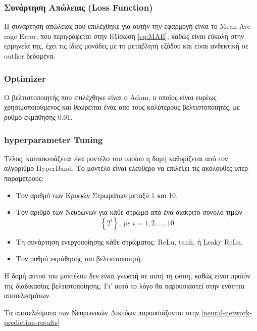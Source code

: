 \subsubsection{Συνάρτηση Απώλειας (\textlatin{Loss Function})}

Η συνάρτηση απώλειας που επιλέχθηκε για αυτήν την εφαρμογή είναι το \textlatin{Mean Average Error}, που περιγράφεται στην Εξίσωση \eqref{eq:MAE}, καθώς είναι εύκολη στην ερμηνεία της, έχει τις ίδιες μονάδες με τη μεταβλητή εξόδου και είναι ανθεκτική σε \textlatin{outlier} δεδομένα.

\subsubsection{\textlatin{Optimizer}}

Ο βελτιστοποιητής που επιλέχθηκε είναι ο \textlatin{Adam}, ο οποίος είναι ευρέως χρησιμοποιούμενος και θεωρείται ένας από τους καλύτερους βελτιστοποιητές, με ρυθμό εκμάθησης 0.01.

\subsubsection{\textlatin{hyperparameter Tuning}}
\label{Hyper-Parameter-Tuning}

Τέλος, κατασκευάζεται ένα μοντέλο του οποίου η δομή καθορίζεται από τον αλγόριθμο \textlatin{HyperBand}. Το μοντέλο είναι ελεύθερο να επιλέξει τις ακόλουθες υπερ-παραμέτρους:

\begin{itemize}
\item
  Τον αριθμό των Κρυφών Στρωμάτων μεταξύ 1 και 10.
\item
  Τον αριθμό των Νευρώνων για κάθε στρώμα από ένα διακριτό σύνολο τιμών
  \[\left\{ 2^{i} \right\}, \ \text{με}\ i = 1,2,\ldots ,10\]
\item
  Τη συνάρτηση ενεργοποίησης κάθε στρώματος:  \textlatin{ReLu, tanh,} ή \textlatin{Leaky ReLu}.
\item
  Τον  ρυθμό εκμάθησης του βελτιστοποιητή.
\end{itemize}

Η δομή αυτού του μοντέλου δεν είναι γνωστή σε αυτή τη φάση, καθώς είναι προϊόν της διαδικασίας βελτιστοποίησης. Γι' αυτό το λόγο θα παρουσιαστεί στην ενότητα αποτελεσμάτων.

Τα αποτελέσματα των Νευρωνικών Δικτύων παρουσιάζονται στην \autoref{neural-network-prediction-results}

